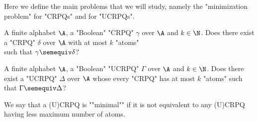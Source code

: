
Here we define the main problems that we will study, namely the "minimization problem" for "CRPQs" and for "UCRPQs".


\AP
{}
{A finite alphabet $\A$, a "Boolean"  "CRPQ" $\gamma$ over $\A$ and $k \in \N$.}
{Does there exist a "CRPQ" $\delta$ over $\A$ with at most $k$ "atoms"\\ 
such that $\gamma \semequiv \delta$?}

{A finite alphabet $\A$, a "Boolean"  "UCRPQ" $\Gamma$ over $\A$ and $k \in \N$.}
{Does there exist a "UCRPQ" $\Delta$ over $\A$ whose every "CRPQ" has at most $k$ "atoms" 
such that $\Gamma \semequiv \Delta$?}



\AP
We say that a (U)CRPQ is ""minimal"" if it is not equivalent to any (U)CRPQ having less maximum number of atoms.

